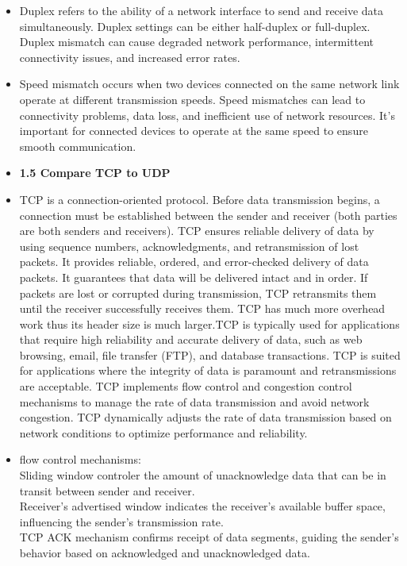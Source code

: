 \documentclass{article}
\begin{document}
\begin{itemize}
	\item[] Duplex refers to the ability of a network interface to send and receive data simultaneously. Duplex settings can be either half-duplex or full-duplex. Duplex mismatch can cause degraded network performance, intermittent connectivity issues, and increased error rates.
 	\item[] Speed mismatch occurs when two devices connected on the same network link operate at different transmission speeds. Speed mismatches can lead to connectivity problems, data loss, and inefficient use of network resources. It's important for connected devices to operate at the same speed to ensure smooth communication.
  	
  \item \textbf{1.5 Compare TCP to UDP}
  	\item[] TCP is a connection-oriented protocol. Before data transmission begins, a connection must be established between the sender and receiver (both parties are both senders and receivers). TCP ensures reliable delivery of data by using sequence numbers, acknowledgments, and retransmission of lost packets. It provides reliable, ordered, and error-checked delivery of data packets. It guarantees that data will be delivered intact and in order. If packets are lost or corrupted during transmission, TCP retransmits them until the receiver successfully receives them. TCP has much more overhead work thus its header size is much larger.TCP is typically used for applications that require high reliability and accurate delivery of data, such as web browsing, email, file transfer (FTP), and database transactions. TCP is suited for applications where the integrity of data is paramount and retransmissions are acceptable. TCP implements flow control and congestion control mechanisms to manage the rate of data transmission and avoid network congestion. TCP dynamically adjusts the rate of data transmission based on network conditions to optimize performance and reliability.\\
  	\item[] flow control mechanisms:\\
		Sliding window controler the amount of unacknowledge data that can be in transit between sender and receiver.\\
		Receiver's advertised window indicates the receiver's available buffer space, influencing the sender's transmission rate.\\
		TCP ACK mechanism confirms receipt of data segments, guiding the sender's behavior based on acknowledged and unacknowledged data.\\

\end{itemize}
\end{document}
